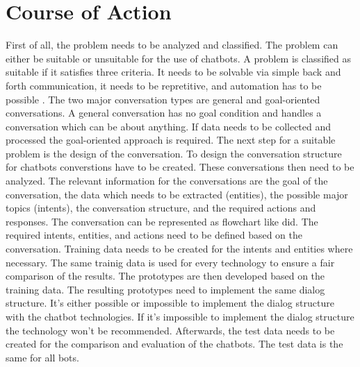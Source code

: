 \section{Course of Action} %
First of all, the problem needs to be analyzed and classified.
The problem can either be suitable or unsuitable for the use of chatbots.
A problem is classified as suitable if it satisfies three criteria. 
It needs to be solvable via simple back and forth communication,
it needs to be repretitive, and automation has to be possible \citet{singhbuilding}.
The two major conversation types are general and goal-oriented conversations.
A general conversation has no goal condition and handles a conversation which can be 
about anything. 
If data needs to be collected and processed the goal-oriented approach is required.
The next step for a suitable problem is the design of the conversation.
To design the conversation structure for chatbots converstions have to be created.
These conversations then need to be analyzed.
The relevant information for the conversations are the goal of the conversation, the 
data which needs to be extracted (entities), the possible major topics (intents), 
the conversation structure, and the required actions and responses.
The conversation can be represented as flowchart like \citet{singhbuilding} did.
The required intents, entities, and actions need to be defined based on the conversation.
Training data needs to be created for the intents and entities where necessary.
The same trainig data is used for every technology to ensure a fair 
comparison of the results.
The prototypes are then developed based on the training data.
The resulting prototypes need to implement the same dialog structure.
It's either possible or impossible to implement the dialog structure with the 
chatbot technologies. 
If it's impossible to implement the dialog structure the technology 
won't be recommended.
Afterwards, the test data needs to be created for the comparison and evaluation of 
the chatbots.
The test data is the same for all bots.

